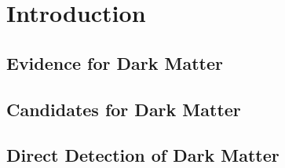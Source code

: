 \chapter{Introduction}\label{chap:intro}
\section{Evidence for Dark Matter}
\section{Candidates for Dark Matter}
\section{Direct Detection of Dark Matter}